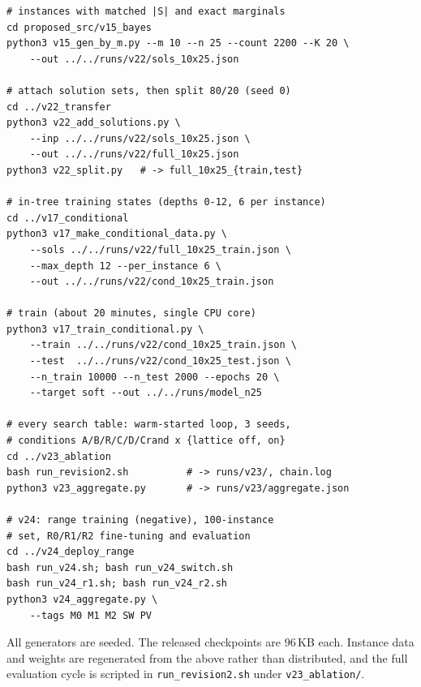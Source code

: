 \documentclass[preprint,12pt]{elsarticle}
\begin{document}
{\small\begin{verbatim}
# instances with matched |S| and exact marginals
cd proposed_src/v15_bayes
python3 v15_gen_by_m.py --m 10 --n 25 --count 2200 --K 20 \
    --out ../../runs/v22/sols_10x25.json

# attach solution sets, then split 80/20 (seed 0)
cd ../v22_transfer
python3 v22_add_solutions.py \
    --inp ../../runs/v22/sols_10x25.json \
    --out ../../runs/v22/full_10x25.json
python3 v22_split.py   # -> full_10x25_{train,test}

# in-tree training states (depths 0-12, 6 per instance)
cd ../v17_conditional
python3 v17_make_conditional_data.py \
    --sols ../../runs/v22/full_10x25_train.json \
    --max_depth 12 --per_instance 6 \
    --out ../../runs/v22/cond_10x25_train.json

# train (about 20 minutes, single CPU core)
python3 v17_train_conditional.py \
    --train ../../runs/v22/cond_10x25_train.json \
    --test  ../../runs/v22/cond_10x25_test.json \
    --n_train 10000 --n_test 2000 --epochs 20 \
    --target soft --out ../../runs/model_n25

# every search table: warm-started loop, 3 seeds,
# conditions A/B/R/C/D/Crand x {lattice off, on}
cd ../v23_ablation
bash run_revision2.sh          # -> runs/v23/, chain.log
python3 v23_aggregate.py       # -> runs/v23/aggregate.json

# v24: range training (negative), 100-instance
# set, R0/R1/R2 fine-tuning and evaluation
cd ../v24_deploy_range
bash run_v24.sh; bash run_v24_switch.sh
bash run_v24_r1.sh; bash run_v24_r2.sh
python3 v24_aggregate.py \
    --tags M0 M1 M2 SW PV
\end{verbatim}}

All generators are seeded. The released checkpoints are $96$\,KB each. Instance data and weights are regenerated from the above rather than distributed, and the full evaluation cycle is scripted in \texttt{run\_revision2.sh} under \texttt{v23\_ablation/}.
\end{document}
